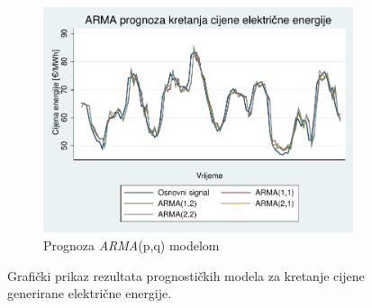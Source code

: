 \documentclass[a4paper,12pt,oneside]{memoir}
\begin{document}
\begin{figure}[H]
\begin{subfigure}[b] {0.50\linewidth}
                \label{fig:price_graph_ma}
            \end{subfigure}
            \\~\\
            \begin{subfigure}[b] {0.50\linewidth}
                \centering
                \includegraphics[width=\textwidth]{graphs/price_graph_arma.pdf}
                \caption{Prognoza \textit{ARMA}(p,q) modelom}      
                \label{fig:price_graph_ma}
            \end{subfigure}
            \caption{Grafički prikaz rezultata prognostičkih modela za kretanje cijene generirane električne energije.}
            \label{fig:price_models}    
        \end{figure}
\end{document}
